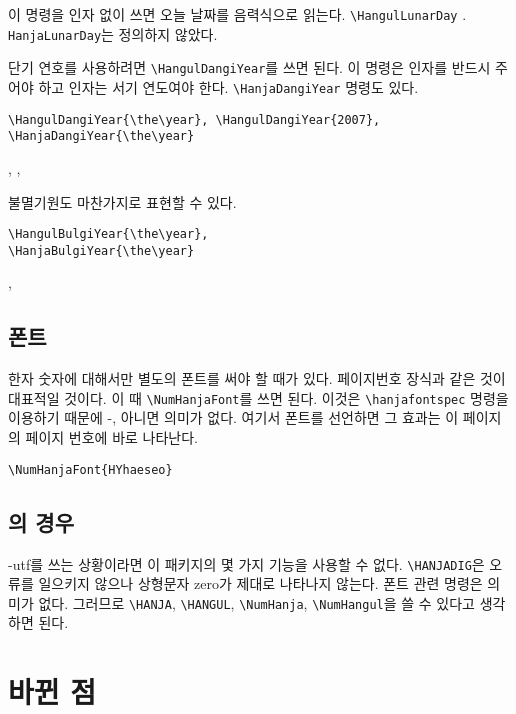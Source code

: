 \documentclass[b5paper,nanum]{oblivoir}
\def\cs#1{\texttt{\textbackslash #1}}
\def\ct#1{\texttt{#1}}
\def\xetexko{\hologo{XeTeX}-\ko}
\def\luatexko{\hologo{LuaTeX}-\ko}
\begin{document}
\medskip

이 명령을 인자 없이 쓰면 오늘 날짜를 음력식으로 읽는다. \cs{HangulLunarDay} \HangulLunarDay.
\ct{HanjaLunarDay}는 정의하지 않았다.

단기 연호를 사용하려면 \cs{HangulDangiYear}를 쓰면 된다. 이 명령은 인자를 반드시 주어야 하고 인자는 서기 연도여야 한다. \cs{HanjaDangiYear} 명령도 있다.
\begin{verbatim}
\HangulDangiYear{\the\year}, \HangulDangiYear{2007},
\HanjaDangiYear{\the\year}
\end{verbatim}
\HangulDangiYear{\the\year}, , \HanjaDangiYear{\the\year}

\medskip

불멸기원도 마찬가지로 표현할 수 있다.
\begin{verbatim}
\HangulBulgiYear{\the\year},
\HanjaBulgiYear{\the\year}
\end{verbatim}
\HangulBulgiYear{\the\year},
\HanjaBulgiYear{\the\year}


\subsection{폰트}
\begin{boxedverbatim}
\end{boxedverbatim}
한자 숫자에 대해서만 별도의 폰트를 써야 할 때가 있다. 페이지번호 장식과 같은 것이 대표적일 것이다.
이 때 \cs{NumHanjaFont}를 쓰면 된다. 이것은 \cs{hanjafontspec} 명령을 이용하기 때문에
\xetexko,  아니면 의미가 없다. 여기서 폰트를 선언하면 그 효과는 이 페이지의 페이지 번호에 바로 나타난다.
\begin{verbatim}
\NumHanjaFont{HYhaeseo}
\end{verbatim}

\subsection{\texorpdfstring{\pdftex}{pdfTeX}의 경우}
 \koTeX-utf를 쓰는 상황이라면 이 패키지의 몇 가지 기능을 사용할 수 없다. \cs{HANJADIG}은
오류를 일으키지 않으나 상형문자 zero가 제대로 나타나지 않는다. 폰트 관련 명령은  의미가 없다.
그러므로 \cs{HANJA}, \cs{HANGUL}, \cs{NumHanja}, \cs{NumHangul}을 쓸 수 있다고 생각하면 된다.


\section{바뀐 점}
\end{document}
